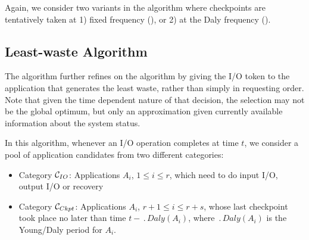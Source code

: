 Again, we consider two variants in the \fifononblock algorithm where checkpoints are
tentatively taken at 1) fixed frequency (\fifofixed), or 2) at the
Daly frequency (\fifodaly).



\subsection{Least-waste Algorithm}

The \leastwaste algorithm further refines on the \fifononblock algorithm
by giving the I/O token to the application that generates the least
waste, rather than simply in requesting order. Note that given the time
dependent nature of that decision, the selection may
not be the global optimum, but only an approximation given currently
available information about the system status.

In this algorithm, whenever an I/O operation completes at time $t$,
we consider a pool of application candidates from two different categories:

\begin{itemize}
 \item Category \IOcat $\mathcal{C}_{IO}$: Applications $A_{i}$, $1\leq i \leq r$, which
 need to do input I/O, output I/O or recovery
 \item Category \Ckptcat $\mathcal{C}_{Ckpt}$: Applications $A_{i}$, $r+1\leq i \leq r+s$,
 whose last checkpoint took place no later than time $t - \period{Daly}(A_{i})$, where
 $\period{Daly}(A_{i})$ is the Young/Daly period for $A_{i}$.
\end{itemize}

